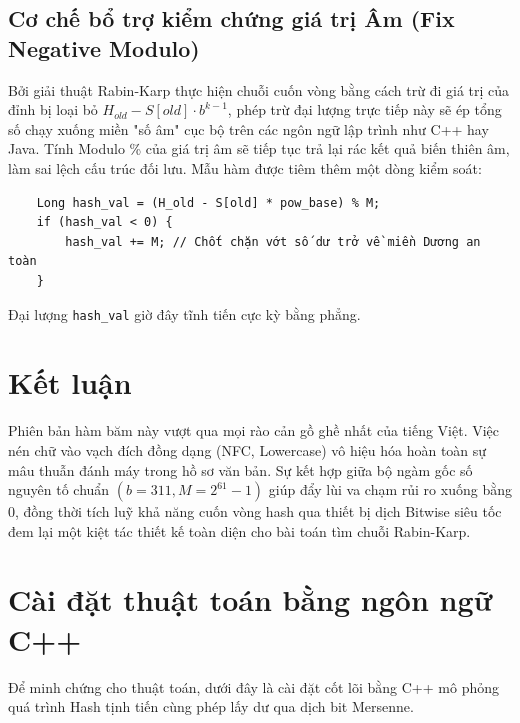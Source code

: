 \documentclass[a4paper,12pt]{article}
\begin{document}
\subsection{Cơ chế bổ trợ kiểm chứng giá trị Âm (Fix Negative Modulo)}

Bởi giải thuật Rabin-Karp thực hiện chuỗi cuốn vòng bằng cách trừ đi giá trị của đỉnh bị loại bỏ $H_{old} - S[old] \cdot b^{k-1}$, phép trừ đại lượng trực tiếp này sẽ ép tổng số chạy xuống miền "số âm" cục bộ trên các ngôn ngữ lập trình như C++ hay Java. Tính Modulo \% của giá trị âm sẽ tiếp tục trả lại rác kết quả biến thiên âm, làm sai lệch cấu trúc đối lưu. Mẫu hàm được tiêm thêm một dòng kiểm soát:
\begin{verbatim}
    Long hash_val = (H_old - S[old] * pow_base) % M;
    if (hash_val < 0) {
        hash_val += M; // Chốt chặn vớt số dư trở về miền Dương an toàn
    }
\end{verbatim}
Đại lượng \verb|hash_val| giờ đây tĩnh tiến cực kỳ bằng phẳng.

\section{Kết luận}

Phiên bản hàm băm này vượt qua mọi rào cản gồ ghề nhất của tiếng Việt. Việc nén chữ vào vạch đích đồng dạng (NFC, Lowercase) vô hiệu hóa hoàn toàn sự mâu thuẫn đánh máy trong hồ sơ văn bản. Sự kết hợp giữa bộ ngàm gốc số nguyên tố chuẩn $(b=311, M=2^{61}-1)$ giúp đẩy lùi va chạm rủi ro xuống bằng 0, đồng thời tích luỹ khả năng cuốn vòng hash qua thiết bị dịch Bitwise siêu tốc đem lại một kiệt tác thiết kế toàn diện cho bài toán tìm chuỗi Rabin-Karp.

\section{Cài đặt thuật toán bằng ngôn ngữ C++}

Để minh chứng cho thuật toán, dưới đây là cài đặt cốt lõi bằng C++ mô phỏng quá trình Hash tịnh tiến cùng phép lấy dư qua dịch bit Mersenne.
\end{document}
